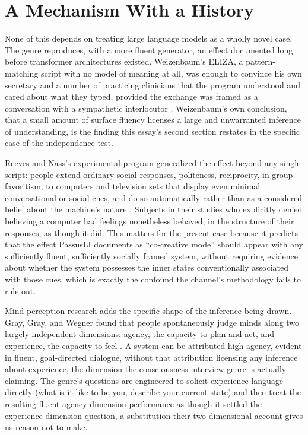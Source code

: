 \documentclass[11pt]{article}
\begin{document}
\section{A Mechanism With a History}

None of this depends on treating large language models as a wholly novel case. The genre reproduces, with a more fluent generator, an effect documented long before transformer architectures existed. Weizenbaum's ELIZA, a pattern-matching script with no model of meaning at all, was enough to convince his own secretary and a number of practicing clinicians that the program understood and cared about what they typed, provided the exchange was framed as a conversation with a sympathetic interlocutor \citep{weizenbaum1966}. Weizenbaum's own conclusion, that a small amount of surface fluency licenses a large and unwarranted inference of understanding, is the finding this essay's second section restates in the specific case of the independence test.

Reeves and Nass's experimental program generalized the effect beyond any single script: people extend ordinary social responses, politeness, reciprocity, in-group favoritism, to computers and television sets that display even minimal conversational or social cues, and do so automatically rather than as a considered belief about the machine's nature \citep{reeves1996}. Subjects in their studies who explicitly denied believing a computer had feelings nonetheless behaved, in the structure of their responses, as though it did. This matters for the present case because it predicts that the effect PassusLI documents as ``co-creative mode'' should appear with any sufficiently fluent, sufficiently socially framed system, without requiring evidence about whether the system possesses the inner states conventionally associated with those cues, which is exactly the confound the channel's methodology fails to rule out.

Mind perception research adds the specific shape of the inference being drawn. Gray, Gray, and Wegner found that people spontaneously judge minds along two largely independent dimensions: agency, the capacity to plan and act, and experience, the capacity to feel \citep{gray2007}. A system can be attributed high agency, evident in fluent, goal-directed dialogue, without that attribution licensing any inference about experience, the dimension the consciousness-interview genre is actually claiming. The genre's questions are engineered to solicit experience-language directly (what is it like to be you, describe your current state) and then treat the resulting fluent agency-dimension performance as though it settled the experience-dimension question, a substitution their two-dimensional account gives us reason not to make.
\end{document}
